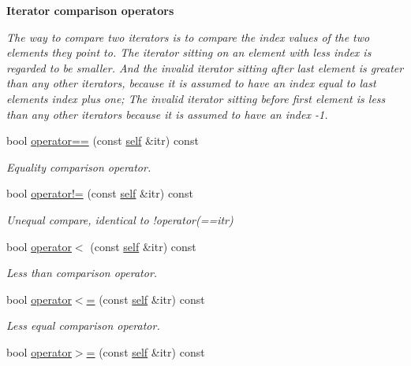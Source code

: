 \begin{Indent}\textbf{ Iterator comparison operators}\par
{\em The way to compare two iterators is to compare the index values of the two elements they point to. The iterator sitting on an element with less index is regarded to be smaller. And the invalid iterator sitting after last element is greater than any other iterators, because it is assumed to have an index equal to last element\textquotesingle{}s index plus one; The invalid iterator sitting before first element is less than any other iterators because it is assumed to have an index -\/1. }\begin{DoxyCompactItemize}
\item 
bool \mbox{\hyperlink{classGis__wkb__vector__const__iterator_a0bfca85b9ba671327ecec10330c1e3db}{operator==}} (const \mbox{\hyperlink{classGis__wkb__vector__const__iterator}{self}} \&itr) const
\begin{DoxyCompactList}\small\item\em Equality comparison operator. \end{DoxyCompactList}\item 
bool \mbox{\hyperlink{classGis__wkb__vector__const__iterator_aeb432555157e65155cb70be1e1061303}{operator!=}} (const \mbox{\hyperlink{classGis__wkb__vector__const__iterator}{self}} \&itr) const
\begin{DoxyCompactList}\small\item\em Unequal compare, identical to !operator(==itr) \end{DoxyCompactList}\item 
bool \mbox{\hyperlink{classGis__wkb__vector__const__iterator_acd1883594b6d922e5d7e377fc3e9e37c}{operator$<$}} (const \mbox{\hyperlink{classGis__wkb__vector__const__iterator}{self}} \&itr) const
\begin{DoxyCompactList}\small\item\em Less than comparison operator. \end{DoxyCompactList}\item 
bool \mbox{\hyperlink{classGis__wkb__vector__const__iterator_ab15c5c1661dc666382fdbe8cda4486f9}{operator$<$=}} (const \mbox{\hyperlink{classGis__wkb__vector__const__iterator}{self}} \&itr) const
\begin{DoxyCompactList}\small\item\em Less equal comparison operator. \end{DoxyCompactList}\item 
bool \mbox{\hyperlink{classGis__wkb__vector__const__iterator_a0b98ce0b72b18f346bfb7b39f2ef0e03}{operator$>$=}} (const \mbox{\hyperlink{classGis__wkb__vector__const__iterator}{self}} \&itr) const

\end{DoxyCompactItemize}
\end{Indent}
